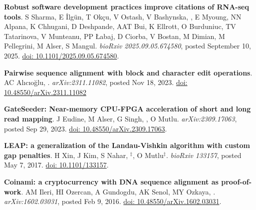    
\vspace{-.2cm}
    {\bf Robust software development practices improve citations of RNA-seq tools}. S Sharma, E İlgün, T Okçu, V Ostash, V Bashynska, \calkan{}, E Myoung, NN Alpana, K Chhugani, D Deshpande, AAT Bui, K Ellrott, O Burduniuc, TV Tatarinova, V Munteanu, PP Łabaj, D Ciorba, V Bostan, M Dimian, M Pellegrini, M Alser, S Mangul. {\it bioRxiv 2025.09.05.674580}, posted September 10, 2025. \href{https://doi.org/10.1101/2025.09.05.674580}{doi: 10.1101/2025.09.05.674580}.

  

\vspace{-.2cm}
    {\bf Pairwise sequence alignment with block and character edit operations}. AC Alıcıoğlu, \calkan{}. {\it arXiv:2311.11082}, posted Nov 18, 2023. \href{https://doi.org/10.48550/arXiv.2311.11082}{doi: 10.48550/arXiv.2311.11082}

\vspace{-.2cm}
    {\bf GateSeeder: Near-memory CPU-FPGA acceleration of short and long read mapping}. J Eudine, M Alser, G Singh, \calkan{}, O Mutlu. {\it arXiv:2309.17063}, posted Sep 29, 2023. \href{https://doi.org/10.48550/arXiv.2309.17063}{doi: 10.48550/arXiv.2309.17063}.

\vspace{-.2cm}
    {\bf LEAP: a generalization of the Landau-Vishkin algorithm with custom gap penalties}. H Xin, J Kim, S Nahar, \calkan{}$^\ddag$, O Mutlu$^\ddag$. {\it bioRxiv 133157}, posted May 7, 2017. 
    \href{https://doi.org/10.1101/133157}{doi: 10.1101/133157}.


\vspace{-.2cm}
    {\bf Coinami: a cryptocurrency with DNA sequence alignment as proof-of-work}. AM Ileri, HI Ozercan, A Gundogdu, AK Senol, MY Ozkaya, \calkan{}. {\it arXiv:1602.03031}, posted Feb 9, 2016. \href{https://doi.org/10.48550/arXiv.1602.03031}{doi: 10.48550/arXiv.1602.03031}.

\vspace{-.4cm}

